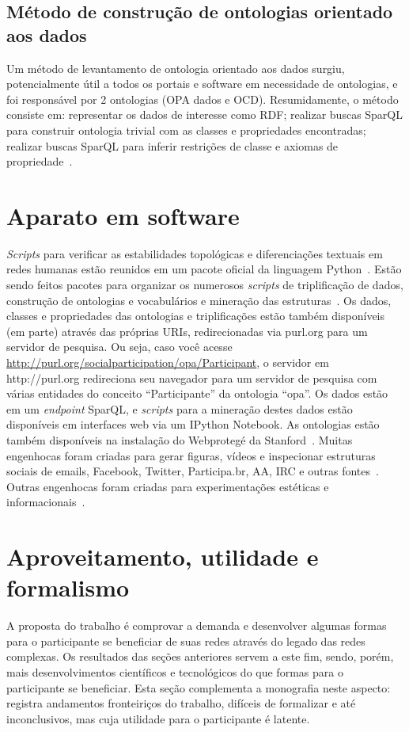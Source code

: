 \documentclass[a4paper,openright,12pt]{report} %
\begin{document}
\subsection{Método de construção de ontologias orientado aos dados}
Um método de levantamento de ontologia orientado aos dados surgiu, potencialmente útil a todos os portais e software em necessidade de ontologias, e foi responsável por 2 ontologias (OPA dados e OCD).
Resumidamente, o método consiste em: representar os dados de interesse como RDF; realizar buscas SparQL para construir ontologia trivial com as classes e propriedades encontradas; realizar buscas SparQL para inferir restrições de classe e axiomas de propriedade~\cite{pnud5,scriptOCD,scriptOPA}.

\section{Aparato em software}
\emph{Scripts} para verificar as estabilidades topológicas e diferenciações textuais em redes humanas estão reunidos em um pacote oficial da linguagem Python~\cite{gmanePack}.
Estão sendo feitos pacotes para organizar os numerosos \emph{scripts}
de triplificação de dados, construção de ontologias e vocabulários e mineração das
estruturas~\cite{participation, percolation}. 
Os dados, classes e propriedades das
ontologias e triplificações estão também disponíveis (em parte)
através das próprias URIs, redirecionadas via purl.org
para um servidor de pesquisa. Ou seja,
caso você acesse \url{http://purl.org/socialparticipation/opa/Participant},
o servidor em http://purl.org redireciona seu navegador para
um servidor de pesquisa com várias entidades do conceito ``Participante''
da ontologia ``opa''.
Os dados estão em um \emph{endpoint} SparQL, e \emph{scripts} para a mineração
destes dados estão disponíveis em interfaces web via um
IPython Notebook. As ontologias estão também disponíveis
na instalação do Webprotegé da Stanford~\cite{pnud5}.
Muitas engenhocas foram criadas para gerar figuras, vídeos e inspecionar
estruturas sociais de emails, Facebook, Twitter, Participa.br, AA, IRC e outras
fontes~\cite{engeHeraGmane,social,ensaaio,ensaioAA}.
Outras engenhocas foram criadas para experimentações estéticas e
informacionais~\cite{mmissa,teloes,gmane,governArt}.

\section{Aproveitamento, utilidade e formalismo}
A proposta do trabalho é comprovar a demanda e desenvolver algumas formas para o participante se beneficiar de suas redes através do legado das redes complexas.
Os resultados das seções anteriores servem a este fim, sendo, porém, mais desenvolvimentos científicos e tecnológicos do que formas
para o participante se beneficiar.
Esta seção complementa a monografia neste aspecto:
registra andamentos fronteiriços do trabalho, difíceis de formalizar e até inconclusivos,
mas cuja utilidade para o participante é latente.
\end{document}
